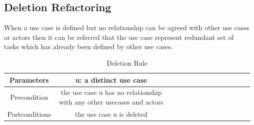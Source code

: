 \subsection{Deletion Refactoring}\label{section:selection_by_use_case/guidelines_for_use_case_refactoring/deletion_refactoring}
When a use case is defined but no relationship can be agreed with other use cases or actors then it can be referred that the use case represent redundant set of tasks which has already been defined by other use cases.
\begin{table}[H]
  \centering
  \begin{adjustbox}{max width=\textwidth}
  \begin{tabular}{*{14}{|c}|}%
  \hline
  Parameters      & u: a distinct use case\\
                    \hline
   Precondition     & the use case u has no relationship with any other usecases and actors\\
                    \hline
   Postconditions   & the use case u is deleted\\
                    \hline
\end{tabular}
\end{adjustbox}
  \caption{Deletion Rule}
  \label{tab:selection_by_use_case/guidelines_for_use_case_refactoring/deletion_rule}
\end{table}
\\

